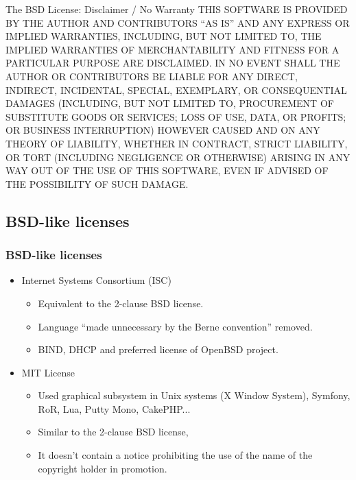 \documentclass{beamer}
\begin{document}

\begin{frame}

\begin{block}{The BSD License: Disclaimer / No Warranty}
{\footnotesize
THIS SOFTWARE IS PROVIDED BY THE AUTHOR AND CONTRIBUTORS ``AS IS'' 
AND ANY EXPRESS OR IMPLIED WARRANTIES, INCLUDING, BUT NOT LIMITED TO, 
THE IMPLIED WARRANTIES OF MERCHANTABILITY AND FITNESS FOR A PARTICULAR 
PURPOSE ARE DISCLAIMED. IN NO EVENT SHALL THE AUTHOR OR CONTRIBUTORS 
BE LIABLE FOR ANY DIRECT, INDIRECT, INCIDENTAL, SPECIAL, EXEMPLARY, 
OR CONSEQUENTIAL DAMAGES (INCLUDING, BUT NOT LIMITED TO, PROCUREMENT 
OF SUBSTITUTE GOODS OR SERVICES; LOSS OF USE, DATA, OR PROFITS; 
OR BUSINESS INTERRUPTION) HOWEVER CAUSED AND ON ANY THEORY OF LIABILITY, 
WHETHER IN CONTRACT, STRICT LIABILITY, OR TORT (INCLUDING NEGLIGENCE 
OR OTHERWISE) ARISING IN ANY WAY OUT OF THE USE OF THIS SOFTWARE, 
EVEN IF ADVISED OF THE POSSIBILITY OF SUCH DAMAGE.
}
\end{block}
\end{frame}

\subsection{BSD-like licenses}
\begin{frame}
\frametitle{BSD-like licenses}

\begin{itemize}

\item \alert{Internet Systems Consortium (ISC)} 
	\begin{itemize}
	\item Equivalent to the 2-clause BSD license.
	\item Language ``made unnecessary by the Berne convention'' removed.
	\item BIND, DHCP and preferred license of OpenBSD project.
	\end{itemize}
\item \alert{MIT License}
	\begin{itemize}
	\item Used graphical subsystem in Unix systems (X Window System), Symfony, RoR, Lua, Putty Mono, CakePHP... 
	\item Similar to the 2-clause BSD license, 
	\item It doesn't contain a notice prohibiting the use of the name of the copyright holder in promotion.
     	\end{itemize}
\end{itemize}

\end{frame}
\end{document}
